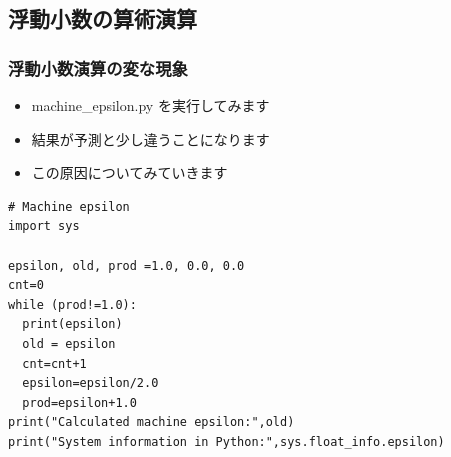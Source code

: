 \subsection{浮動小数の算術演算}
\begin{frame}
\frametitle{浮動小数演算の変な現象}
  \begin{itemize}
\item machine\_epsilon.py を実行してみます
\item 結果が予測と少し違うことになります
\item この原因についてみていきます
  \end{itemize}
  \begin{lstlisting}[caption={machine\_epsilon.py}]
# Machine epsilon
import sys

epsilon, old, prod =1.0, 0.0, 0.0
cnt=0
while (prod!=1.0):
  print(epsilon)
  old = epsilon
  cnt=cnt+1
  epsilon=epsilon/2.0
  prod=epsilon+1.0
print("Calculated machine epsilon:",old)
print("System information in Python:",sys.float_info.epsilon)
  \end{lstlisting}
\end{frame}
